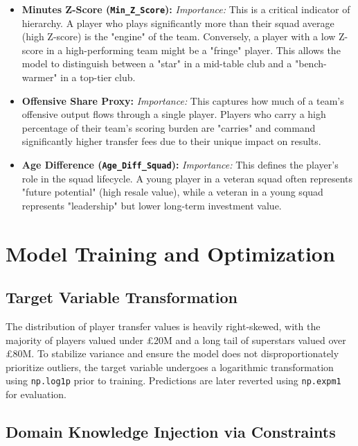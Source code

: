 \documentclass[a4paper,12pt]{report}
\begin{document}
\begin{itemize}
    \item \textbf{Minutes Z-Score (\texttt{Min\_Z\_Score}):} 
    \textit{Importance:} This is a critical indicator of hierarchy. A player who plays significantly more than their squad average (high Z-score) is the "engine" of the team. Conversely, a player with a low Z-score in a high-performing team might be a "fringe" player. This allows the model to distinguish between a "star" in a mid-table club and a "bench-warmer" in a top-tier club.
    
    \item \textbf{Offensive Share Proxy:} 
    \textit{Importance:} This captures how much of a team's offensive output flows through a single player. Players who carry a high percentage of their team's scoring burden are "carries" and command significantly higher transfer fees due to their unique impact on results.
    
    \item \textbf{Age Difference (\texttt{Age\_Diff\_Squad}):} 
    \textit{Importance:} This defines the player's role in the squad lifecycle. A young player in a veteran squad often represents "future potential" (high resale value), while a veteran in a young squad represents "leadership" but lower long-term investment value.
\end{itemize}

\section{Model Training and Optimization}

\subsection{Target Variable Transformation}

The distribution of player transfer values is heavily right-skewed, with the majority of players valued under \pounds20M and a long tail of superstars valued over \pounds80M. To stabilize variance and ensure the model does not disproportionately prioritize outliers, the target variable undergoes a logarithmic transformation using \texttt{np.log1p} prior to training. Predictions are later reverted using \texttt{np.expm1} for evaluation.

\subsection{Domain Knowledge Injection via Constraints}
\end{document}
